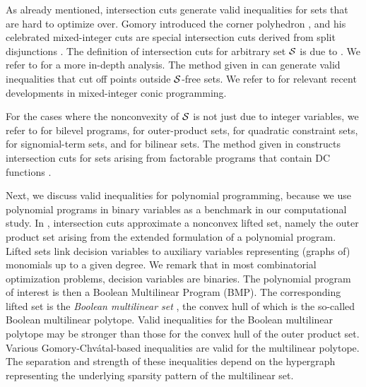 As already mentioned, intersection cuts generate valid inequalities for sets that are hard to optimize over. Gomory introduced the corner polyhedron \cite{gomory1969some}, and his celebrated mixed-integer cuts \cite{gomory1963algorithm} are special intersection cuts derived from split disjunctions \cite{Nemhauser1988}. The definition of intersection cuts for arbitrary set $\mathcal S$ is due to \cite{dey2008,glover1973}. We refer to  \cite{andersen2010,andersen2007,basu2010,basu2019,conforti2015,conforti2011,cornuejols2015sufficiency,del2012relaxations,dey2008,richard2010group} for a more in-depth analysis.  The method given in \cite{towle2021intersection} can generate valid inequalities that cut off points outside $\mathcal S$-free sets. We refer to \cite{andersen2007,belotti2015conic,klnc-karzan2015,kilinc-karzan2016,modaresi2015,modaresi2016} for relevant recent developments in mixed-integer conic programming.

For the cases where the nonconvexity of $\mathcal S$ is not just due to integer variables, we refer to \cite{fischetti2018} for bilevel programs, \cite{bienstock2020outer} for outer-product sets, \cite{munoz2020maximal,munoz2022towards} for quadratic constraint sets, \cite{xusignomial} for signomial-term sets, and \cite{fischetti2020} for bilinear sets. The method given in \cite{serrano2019} constructs intersection cuts  for sets arising from factorable programs that contain DC functions \cite{khamisov1999optimization}.
 
 
Next, we discuss valid inequalities for polynomial programming, because we use polynomial programs in binary variables as a benchmark in our computational study. In \cite{bienstock2020outer}, intersection cuts approximate a nonconvex lifted set, namely the outer product set arising from  the extended formulation of a polynomial program. Lifted sets link decision variables to auxiliary variables representing (graphs of) monomials up to a given degree. We remark that in most combinatorial optimization problems,  decision variables are binaries. The polynomial program of interest is then a Boolean Multilinear Program (BMP).  The corresponding lifted set is the \textit{Boolean multilinear set} \cite{crama1993concave,fortet1960applications}, the convex hull of which is the so-called Boolean multilinear polytope. Valid inequalities for the Boolean multilinear polytope may be stronger than those for the  convex  hull of the outer product set. Various Gomory-Chvátal-based inequalities \cite{del2017polyhedral,del2018multilinear,del2020impact,del2022simple} are valid for the multilinear polytope. The separation and strength of these inequalities depend on  the hypergraph representing the underlying sparsity pattern of the multilinear set.

